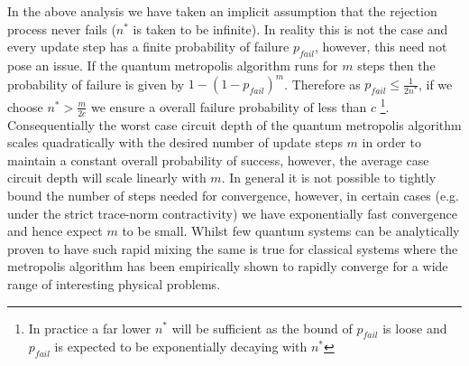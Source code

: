 \documentclass[aps,floatfix,10pt,amssymb,amsfont,amsmath,superscriptaddress,float,nofootinbib,longbibliography,nobalancelastpage,twocolumn]{revtex4-2}
\begin{document}
In the above analysis we have taken an implicit assumption that the rejection process never fails ($n^*$ is taken to be infinite). In reality this is not the case and every update step has a finite probability of failure $p_{fail}$, however, this need not pose an issue. If the quantum metropolis algorithm runs for $m$ steps then the probability of failure is given by $1-(1-p_{fail})^m$. Therefore as $p_{fail} \leq \frac{1}{2n^*}$, if we choose $n^* > \frac{m}{2c}$ we ensure a overall failure probability of less than $c$ \footnote{In practice a far lower $n^*$ will be sufficient as the bound of $p_{fail}$ is loose and $p_{fail}$ is expected to be exponentially decaying with $n^*$}. Consequentially the worst case circuit depth of the quantum metropolis algorithm scales quadratically with the desired number of update steps $m$ in order to maintain a constant overall probability of success, however, the average case circuit depth will scale linearly with $m$. In general it is not possible to tightly bound the number of steps needed for convergence, however, in certain cases (e.g. under the strict trace-norm contractivity) we have exponentially fast convergence and hence expect $m$ to be small. Whilst few quantum systems can be analytically proven to have such rapid mixing the same is true for classical systems where the metropolis algorithm has been empirically shown to rapidly converge for a wide range of interesting physical problems.

\end{document}
